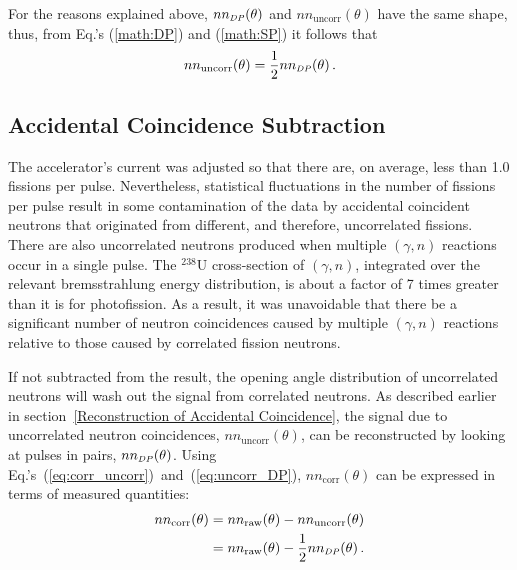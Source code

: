 For the reasons explained above, $nn_{\scaleto{DP}{4pt}}(\theta)$ and $nn_{\text{uncorr}}(\theta)$ have the same shape, thus, from Eq.'s (\ref{math:DP}) and (\ref{math:SP}) it follows that 
\begin{equation}
\label{eq:uncorr_DP}
nn_{\text{uncorr}}(\theta) = \frac{1}{2}nn_{\scaleto{DP}{4pt}}(\theta) \,.
\end{equation}

\subsection{Accidental Coincidence Subtraction}
\label{accidental subtraction}
The accelerator's current was adjusted so that there are, on average, less than 1.0 fissions per pulse.
Nevertheless, statistical fluctuations in the number of fissions per pulse result in some contamination of the data by accidental coincident neutrons that originated from different, and therefore, uncorrelated fissions.
There are also uncorrelated neutrons produced when multiple $(\gamma, n)$ reactions occur in a single pulse.
The $^{238}$U cross-section of $(\gamma, n)$, integrated over the relevant bremsstrahlung energy distribution, is about a factor of 7 times greater than it is for photofission.
As a result, it was unavoidable that there be a significant number of neutron coincidences caused by multiple $(\gamma, n)$ reactions relative to those caused by correlated fission neutrons.

If not subtracted from the result, the opening angle distribution of uncorrelated neutrons will wash out the signal from correlated neutrons. 
As described earlier in section~\ref{Reconstruction of Accidental Coincidence}, the signal due to uncorrelated neutron coincidences, $nn_{\text{uncorr}}(\theta)$, can be reconstructed by looking at pulses in pairs, $nn_{\scaleto{DP}{4pt}}(\theta)$.
Using Eq.'s~(\ref{eq:corr_uncorr})~and~(\ref{eq:uncorr_DP}),  $nn_{\text{corr}}(\theta)$ can be expressed in terms of measured quantities:
\begin{equation} \label{math:SP}
    \begin{split}
    nn_{\text{corr}}(\theta) &=  nn_{\text{raw}}(\theta) - nn_{\text{uncorr}}(\theta) \\
    &= nn_{\text{raw}}(\theta) - \frac{1}{2}nn_{\scaleto{DP}{4pt}}(\theta) \, .
    \end{split}
\end{equation}
